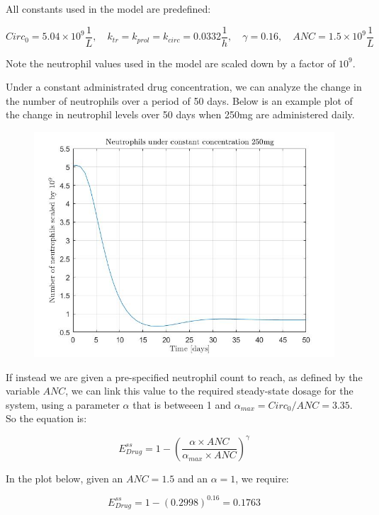 \documentclass[11pt]{article}
\begin{document}
All constants used in the model are predefined:

$$
Circ_0 = 5.04\times 10^9 \frac{1}{L}, \quad k_{tr} = k_{prol} = k_{circ} = 0.0332 \frac{1}{h}, \quad \gamma = 0.16, \quad ANC = 1.5\times 10^9 \frac{1}{L}
$$

Note the neutrophil values used in the model are scaled down by a factor of $10^9$. 

Under a constant administrated drug concentration, we can analyze the change in the number of neutrophils over a period of 50 days. Below is an example plot of the change in neutrophil levels over 50 days when 250mg are administered daily.

\begin{figure}[H]
    \includegraphics[width=\textwidth]{p1image1.jpg}
\end{figure}

If instead we are given a pre-specified neutrophil count to reach, as defined by the variable $ANC$, we can link this value to the required steady-state dosage for the system, using a parameter $\alpha$ that is betweeen 1 and $\alpha_{max} = Circ_0/ANC = 3.35$. So the equation is:

$$
E_{Drug}^{ss} = 1 - (\frac{\alpha \times ANC}{\alpha_{max} \times ANC})^{\gamma}
$$

In the plot below, given an $ANC = 1.5$ and an $\alpha = 1$, we require:

$$
E_{Drug}^{ss} = 1 - (0.2998)^{0.16} = 0.1763
$$
\end{document}
